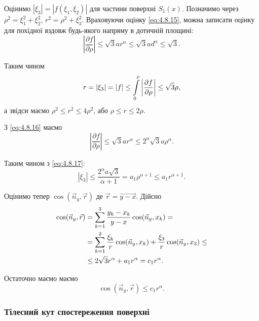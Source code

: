 Оцінимо $|\xi_3| = |f(\xi_1, \xi_2)|$ для частини поверхні $S_1(x)$. Позначимо через $\rho^2 = \xi_1^2 + \xi_2^2$, $r^2 = \rho^2 + \xi_3^2$. Враховуючи оцінку \eqref{eq:4.8.15}, можна записати оцінку для похідної вздовж будь-якого напряму в дотичній площині:
\begin{equation}
	\label{eq:4.8.16}
	\left|\frac{\partial f}{\partial \rho}\right| \le \sqrt{3} a r^{\alpha} \le \sqrt{3} a d^\alpha \le \sqrt{3}.
\end{equation}

Таким чином
\begin{equation}
	\label{eq:4.8.17}
	r = |\xi_3| = |f| \le \displaystyle\int\limits_0^\rho \left|\frac{\partial f}{\partial \rho}\right| \le \sqrt{3} \rho,
\end{equation}
а звідси маємо $\rho^2 \le r^2 \le 4 \rho^2$, або $\rho \le r \le 2 \rho$. \medskip

З \eqref{eq:4.8.16} маємо
\begin{equation}
	\left|\frac{\partial f}{\partial \rho}\right| \le \sqrt{3} a r^{\alpha} \le 2^\alpha \sqrt{3} a \rho^\alpha.
\end{equation}

Таким чином з \eqref{eq:4.8.17}:
	\label{eq:4.8.18}
\begin{equation}
	|\xi_3| \le \frac{2^\alpha a \sqrt{3}}{\alpha + 1} = a_1 \rho^{\alpha + 1} \le a_1 r^{\alpha + 1}.
\end{equation}

Оцінимо тепер $\cos(\vec n_y, \vec r)$ де $\vec r = \vec{y - x}$. Дійсно
\begin{equation}
	\begin{aligned}
		\cos(\vec n_y, \vec r) &= \displaystyle\sum\limits_{k = 1}^3 \frac{y_k - x_k}{y - x} \cos(\vec n_y, x_k) = \\
		&= \displaystyle\sum\limits_{k = 1}^2 \frac{\xi_k}{r} \cos(\vec n_y, x_k) + \frac{\xi_3}{r} \cos(\vec n_y, x_3) \le \\
		&\le 2 \sqrt{3} r^\alpha + a_1 r^\alpha = c_1 r^\alpha.
	\end{aligned}
\end{equation}

Остаточно маємо маємо
\begin{equation}
	\label{eq:4.8.19}
	\cos(\vec n_y, \vec r) \le c_1 r^\alpha.
\end{equation}

\subsubsection{Тілесний кут спостереження поверхні}

